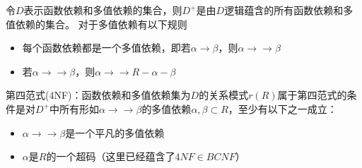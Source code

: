 令$D$表示函数依赖和多值依赖的集合，则$D^+$是由$D$逻辑蕴含的所有函数依赖和多值依赖的集合。
对于多值依赖有以下规则
\begin{itemize}
	\item 每个函数依赖都是一个多值依赖，即若$\alpha\to\beta$，则$\alpha\to\to\beta$
	\item 若$\alpha\to\to\beta$，则$\alpha\to\to R-\alpha-\beta$
\end{itemize}

第四范式(4NF)：函数依赖和多值依赖集为$D$的关系模式$r(R)$属于第四范式的条件是对$D^+$中所有形如$\alpha\to\to\beta$的多值依赖$\alpha,\beta\subset R$，至少有以下之一成立：
\begin{itemize}
	\item $\alpha\to\to\beta$是一个平凡的多值依赖
	\item $\alpha$是$R$的一个超码（这里已经蕴含了$4NF\in BCNF$）
\end{itemize}